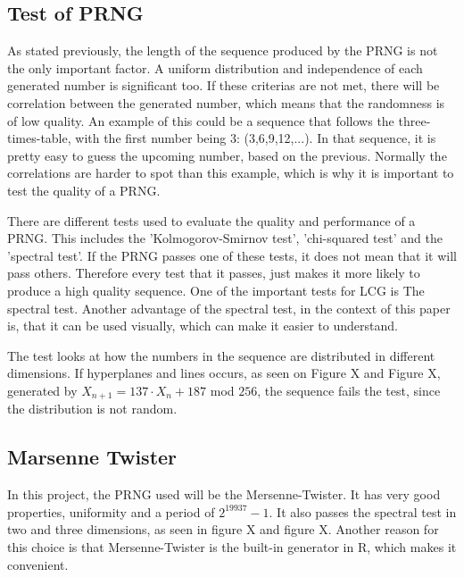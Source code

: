 \subsection{Test of PRNG}
As stated previously, the length of the sequence produced by the PRNG is not the only important factor. A uniform distribution and independence of each generated number is significant too. If these criterias are not met, there will be correlation between the generated number, which means that the randomness is of low quality. An example of this could be a sequence that follows the three-times-table, with the first number being 3: (3,6,9,12,...). In that sequence, it is pretty easy to guess the upcoming number, based on the previous. Normally the correlations are harder to spot than this example, which is why it is important to test the quality of a PRNG.

There are different tests used to evaluate the quality and performance of a PRNG. This includes the 'Kolmogorov-Smirnov test', 'chi-squared test' and the 'spectral test'. If the PRNG passes one of these tests, it does not mean that it will pass others. Therefore every test that it passes, just makes it more likely to produce a high quality sequence. One of the important tests for LCG is The spectral test. Another advantage of the spectral test, in the context of this paper is, that it can be used visually, which can make it easier to understand.

The test looks at how the numbers in the sequence are distributed in different dimensions. If hyperplanes and lines occurs, as seen on Figure X and Figure X, generated by $X_{n+1}=137\cdot X_{n}+187$ mod $256$, the sequence fails the test, since the distribution is not random.


\subsection{Marsenne Twister}
In this project, the PRNG used will be the Mersenne-Twister. It has very good properties, uniformity and a period of $2^19937-1$. It also passes the spectral test in two and three dimensions, as seen in figure X and figure X. Another reason for this choice is that Mersenne-Twister is the built-in generator in R, which makes it convenient. 
\newpage